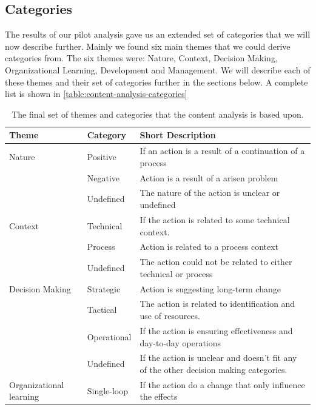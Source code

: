 \subsection{Categories}\label{method:categories}
The results of our pilot analysis gave us an extended set of categories that we will now describe further. Mainly we found six main themes that we could derive categories from. The six themes were: Nature, Context, Decision Making, Organizational Learning, Development and Management. We will describe each of these themes and their set of categories further in the sections below. A complete list is shown in \autoref{table:content-analysis-categories}

\begin{table}[!h]
	\begin{center}
		\caption{The final set of themes and categories that the content analysis is based upon.}
		\label{table:content-analysis-categories}
		\begin{adjustbox}{width=\textwidth, totalheight=0.95\textheight, keepaspectratio}
			\begin{tabular}{| l | l | p{} |}
			\hline
			Theme & Category & Short Description  \\
			\hline
			Nature & Positive & If an action is a result of a continuation of a process \\ \cline{2-3}
			& Negative & Action is a result of a arisen problem \\ \cline{2-3}
			& Undefined & The nature of the action is unclear or undefined \\ \hline
			Context & Technical & If the action is related to some technical context. \\ \cline{2-3}
			& Process & Action is related to a process context \\ \cline{2-3}
			& Undefined & The action could not be related to either technical or process \\ 
			\hline
			Decision Making & Strategic & Action is suggesting long-term change \\ \cline{2-3}
			& Tactical & The action is related to identification and use of resources. \\ \cline{2-3}
			& Operational & If the action is ensuring effectiveness and day-to-day operations \\ \cline{2-3}
			& Undefined & If the action is unclear and doesn't fit any of the other decision making categories. \\ 
			\hline 
			Organizational learning & Single-loop & If the action do a change that only influence the effects \\ \cline{2-3}

\end{tabular}
\end{adjustbox}
\end{center}
\end{table}
